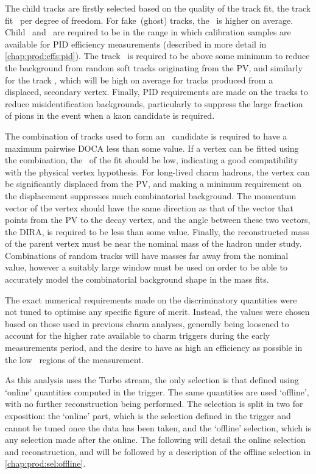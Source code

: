 The child tracks are firstly selected based on the quality of the track fit, 
the track fit \chisq\ per degree of freedom.
For fake~(ghost) tracks, the \chisq\ is higher on average.
Child \ptot\ and \Eta\ are required to be in the range in which calibration 
samples are available for \ac{PID} efficiency measurements (described in more 
detail in \cref{chap:prod:effs:pid}).
The track \pT\ is required to be above some minimum to reduce the background 
from random soft tracks originating from the \ac{PV}, and similarly for the 
track \ipchisq, which will be high on average for tracks produced from a 
displaced, secondary vertex.
Finally, \ac{PID} requirements are made on the tracks to reduce 
misidentification backgrounds, particularly to suppress the large fraction of 
pions in the event when a kaon candidate is required.

The combination of tracks used to form an \PHc\ candidate is required to have a 
maximum pairwise \ac{DOCA} less than some value.
If a vertex can be fitted using the combination, the \chisq\ of the fit should 
be low, indicating a good compatibility with the physical vertex hypothesis.
For long-lived charm hadrons, the vertex can be significantly displaced from 
the \ac{PV}, and making a minimum requirement on the displacement suppresses 
much combinatorial background.
The momentum vector of the vertex should have the same direction as that of the 
vector that points from the \ac{PV} to the decay vertex, and the angle between 
these two vectors, the \ac{DIRA}, is required to be less than some value.
Finally, the reconstructed mass of the parent vertex must be near the nominal 
mass of the hadron under study.
Combinations of random tracks will have masses far away from the nominal value, 
however a suitably large window must be used on order to be able to accurately 
model the combinatorial background shape in the mass fits.

The exact numerical requirements made on the discriminatory quantities were not 
tuned to optimise any specific figure of merit.
Instead, the values were chosen based on those used in previous charm analyses, 
generally being loosened to account for the higher rate available to charm 
triggers during the early measurements period, and the desire to have as high 
an efficiency as possible in the low \pT\ regions of the measurement.

As this analysis uses the Turbo stream, the only selection is that defined 
using `online' quantities computed in the trigger.
The same quantities are used `offline', with no further reconstruction being 
performed.
The selection is split in two for exposition: the `online' part, which is the 
selection defined in the trigger and cannot be tuned once the data has been 
taken, and the `offline' selection, which is any selection made after the 
online.
The following  will detail the online 
selection and reconstruction, and will be followed by a description of the 
offline selection in \cref{chap:prod:sel:offline}.

